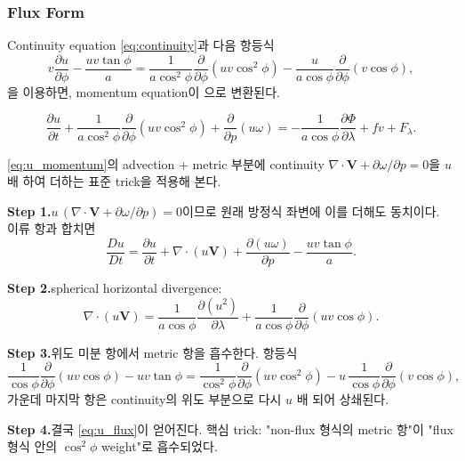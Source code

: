 \subsubsection{Flux Form}

Continuity equation \eqref{eq:continuity}과 다음 항등식
\[
  v\frac{\partial u}{\partial\phi} - \frac{uv\tan\phi}{a}
  = \frac{1}{a\cos^2\phi}\frac{\partial}{\partial\phi}(uv\cos^2\phi)
    - \frac{u}{a\cos\phi}\frac{\partial}{\partial\phi}(v\cos\phi),
\]
을 이용하면, momentum equation이 으로 변환된다.

\begin{equation}\label{eq:u_flux}
  \boxed{
  \frac{\partial u}{\partial t}
    + \frac{1}{a\cos^2\phi}\frac{\partial}{\partial\phi}(uv\cos^2\phi)
    + \frac{\partial}{\partial p}(u\omega)
  = -\frac{1}{a\cos\phi}\frac{\partial\Phi}{\partial\lambda}
    + fv + F_\lambda.
  }
\end{equation}

\begin{example}\label{ex:ch04_hw5_flux_form}
\eqref{eq:u_momentum}의 advection + metric 부분에 continuity
$\nabla\cdot\mathbf{V} + \partial\omega/\partial p = 0$을 $u$ 배 하여
더하는 표준 trick을 적용해 본다.

\smallskip
\textbf{Step 1.}\quad $u\,(\nabla\cdot\mathbf{V} + \partial\omega/\partial p) = 0$이므로
원래 방정식 좌변에 이를 더해도 동치이다.  이류 항과 합치면
\[
  \frac{Du}{Dt} = \frac{\partial u}{\partial t}
    + \nabla\cdot(u\mathbf{V})
    + \frac{\partial(u\omega)}{\partial p}
    - \frac{uv\tan\phi}{a}.
\]

\smallskip
\textbf{Step 2.}\quad spherical horizontal divergence:
\[
  \nabla\cdot(u\mathbf{V})
  = \frac{1}{a\cos\phi}\frac{\partial(u^2)}{\partial\lambda}
   + \frac{1}{a\cos\phi}\frac{\partial}{\partial\phi}(uv\cos\phi).
\]

\smallskip
\textbf{Step 3.}\quad 위도 미분 항에서 metric 항을 흡수한다.  항등식
\[
  \frac{1}{\cos\phi}\frac{\partial}{\partial\phi}(uv\cos\phi)
    - uv\tan\phi
  = \frac{1}{\cos^2\phi}\frac{\partial}{\partial\phi}(uv\cos^2\phi)
    - u\,\frac{1}{\cos\phi}\frac{\partial}{\partial\phi}(v\cos\phi),
\]
가운데 마지막 항은 continuity의 위도 부분으로 다시 $u$ 배 되어 상쇄된다.

\smallskip
\textbf{Step 4.}\quad 결국 \eqref{eq:u_flux}이 얻어진다.  핵심 trick:
"non-flux 형식의 metric 항"이 "flux 형식 안의 $\cos^2\phi$ weight"로 흡수되었다.
\end{example}

